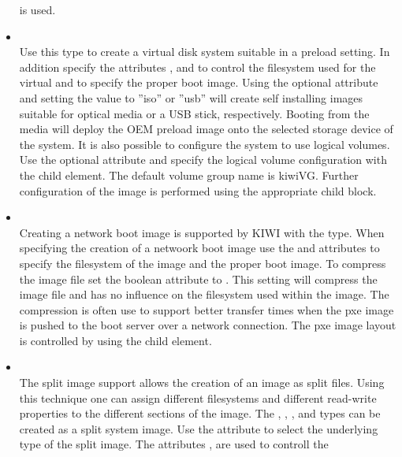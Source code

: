 \begin{itemize}
      is used.
\item {}\\
      Use this type to create a virtual disk system suitable in a preload
      setting. In addition specify the attributes , 
      and  to control the filesystem used
      for the virtual and to specify the proper boot image. Using the optional
       attribute and setting the value to ''iso'' or 
      ''usb'' will create self installing images suitable for optical media
      or a USB stick, respectively. Booting from the media will deploy
      the OEM preload image onto the selected storage device of the
      system. It is also possible to configure the system to use logical
      volumes. Use the optional  attribute and specify the
      logical volume configuration with the  child
      element. The default volume group name is kiwiVG. Further configuration
      of the image is performed using the appropriate  child
      block.
\item {}\\
      Creating a network boot image is supported by KIWI with the 
       type. When specifying the creation of a netwoork boot image use the
       and  attributes 
      to specify the filesystem of the image and the proper boot image. To
      compress the image file set the  boolean attribute
      to . This setting will compress the image file and has no influence
      on the filesystem used within the image. The compression is often use to
      support better transfer times when the pxe image is pushed to the 
      boot server over a network connection. The pxe image layout is
      controlled by using the  child element.
\item {}\\
      The split image support allows the creation of an image as split
      files. Using this technique one can assign different filesystems and
      different read-write properties to the different sections of the image.
      The , , , and  
      types can be created as a split system image. Use the 
       attribute
      to select the underlying type of the split image. The attributes
      ,  are used to controll the

\end{itemize}
